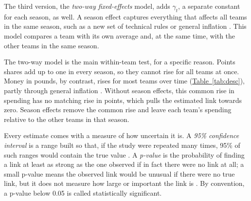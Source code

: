 \documentclass[11pt,a4paper]{article}
\begin{document}
The third version, the \textit{two-way fixed-effects} model, adds $\gamma_t$, a separate constant for each season, as well.
A season effect captures everything that affects all teams in the same season, such as a new set of technical rules or
general inflation \citep[Chapter~5]{angrist2009}. This model compares a team with its own average and, at the same time,
with the other teams in the same season.

The two-way model is the main within-team test, for a specific reason. Points shares add up to one in every season, so
they cannot rise for all teams at once. Money in pounds, by contrast, rises for most teams over time
(\hyperref[tab:desc]{Table~\ref*{tab:desc}}), partly through general inflation \citep{ons_cpi}. Without season effects,
this common rise in spending has no matching rise in points, which pulls the estimated link towards zero. Season effects
remove the common rise and leave each team's spending relative to the other teams in that season.

Every estimate comes with a measure of how uncertain it is. A \textit{95\% confidence
interval} is a range built so that, if the study were repeated many times, 95\% of such ranges would contain the true value
\citep[Chapter~4]{wooldridge2020}. A \textit{p-value} is the probability of finding a link at least as strong as the one
observed if in fact there were no link at all; a small p-value means the observed link would be unusual if there were no
true link, but it does not measure how large or important the link is \citep{wasserstein2016}. By convention, a p-value
below 0.05 is called statistically significant.
\end{document}
